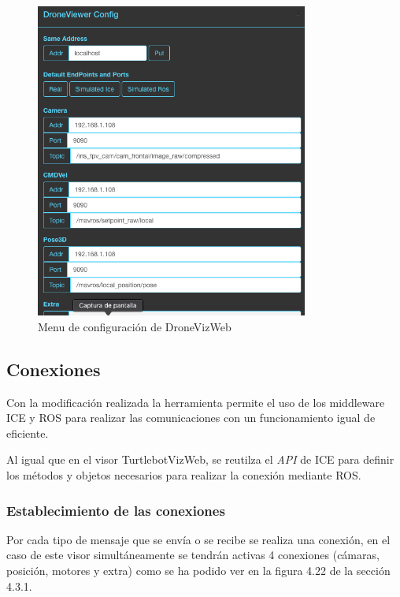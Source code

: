 \begin{figure}[H]
  \begin{center}
    \includegraphics[width=0.8\textwidth]{figures/configdroneviz.png}
		\caption{Menu de configuración de DroneVizWeb}
		\label{fig.configdroneviz}
		\end{center}
\end{figure}

\subsection{Conexiones}

Con la modificación realizada la herramienta permite el uso de los middleware ICE y ROS para realizar las comunicaciones con un funcionamiento igual de eficiente.

Al igual que en el visor TurtlebotVizWeb, se reutilza el \textit{API} de ICE para definir los métodos y objetos necesarios para realizar la conexión mediante ROS.

\subsubsection{Establecimiento de las conexiones}

Por cada tipo de mensaje que se envía o se recibe se realiza una conexión, en el caso de este visor simultáneamente se tendrán activas 4 conexiones (cámaras, posición, motores y extra) como se ha podido ver en la figura 4.22 de la sección 4.3.1.

